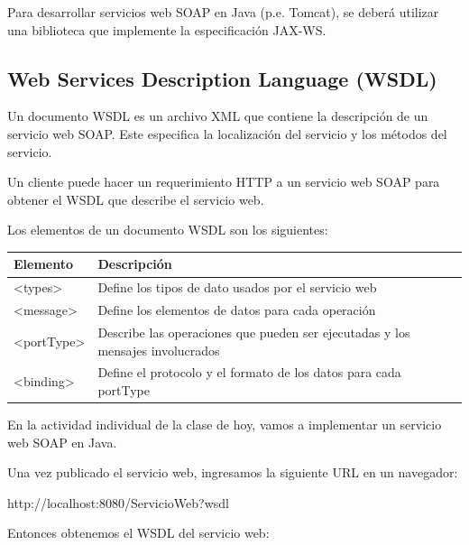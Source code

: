Para desarrollar servicios web SOAP en Java (p.e. Tomcat), se deberá utilizar una biblioteca que implemente la especificación JAX-WS.

\subsection{Web Services Description Language (WSDL)}

Un documento WSDL es un archivo XML que contiene la descripción de un servicio web SOAP. Este especifica la localización del servicio y los métodos del servicio.

Un cliente puede hacer un requerimiento HTTP a un servicio web SOAP para obtener el WSDL que describe el servicio web.

Los elementos de un documento WSDL son los siguientes:

\begin{center}
\small
\begin{tabularx}{\linewidth}{|X|X|}
\hline
Elemento & Descripción \\ \hline
<types> & Define los tipos de dato usados por el servicio web \\ \hline
<message> & Define los elementos de datos para cada operación \\ \hline
<portType> & Describe las operaciones que pueden ser ejecutadas y los mensajes involucrados \\ \hline
<binding> & Define el protocolo y el formato de los datos para cada portType \\ \hline
\end{tabularx}
\end{center}

En la actividad individual de la clase de hoy, vamos a implementar un servicio web SOAP en Java.

Una vez publicado el servicio web, ingresamos la siguiente URL  en un navegador:

\begin{SourceCode}
http://localhost:8080/ServicioWeb?wsdl
\end{SourceCode}

Entonces obtenemos el WSDL del servicio web:


